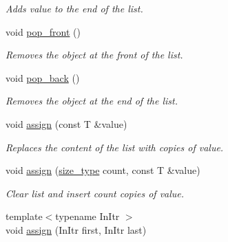 \begin{DoxyCompactItemize}
\begin{DoxyCompactList}\small\item\em Adds value to the end of the list. \end{DoxyCompactList}\item 
\mbox{\label{classls_1_1list_aed8db7c16a16cd2d3290576725f7ffdd}} 
void \hyperlink{classls_1_1list_aed8db7c16a16cd2d3290576725f7ffdd}{pop\+\_\+front} ()
\begin{DoxyCompactList}\small\item\em Removes the object at the front of the list. \end{DoxyCompactList}\item 
\mbox{\label{classls_1_1list_a59d8ce6f60dca1e3a30b3e3d9f4154c2}} 
void \hyperlink{classls_1_1list_a59d8ce6f60dca1e3a30b3e3d9f4154c2}{pop\+\_\+back} ()
\begin{DoxyCompactList}\small\item\em Removes the object at the end of the list. \end{DoxyCompactList}\item 
\mbox{\label{classls_1_1list_aef14276ef9726f7ed30dbe9a76f4035f}} 
void \hyperlink{classls_1_1list_aef14276ef9726f7ed30dbe9a76f4035f}{assign} (const T \&value)
\begin{DoxyCompactList}\small\item\em Replaces the content of the list with copies of value. \end{DoxyCompactList}\item 
\mbox{\label{classls_1_1list_a8a9ebb0c52a3a472e69cae0f50de5737}} 
void \hyperlink{classls_1_1list_a8a9ebb0c52a3a472e69cae0f50de5737}{assign} (\hyperlink{classls_1_1list_a91bb77719712ad6127f0bdf97ed5bd64}{size\+\_\+type} count, const T \&value)
\begin{DoxyCompactList}\small\item\em Clear list and insert count copies of value. \end{DoxyCompactList}\item 
\mbox{\label{classls_1_1list_a8528bc556cc62982161cd369e65ad3b7}} 
{\footnotesize template$<$typename In\+Itr $>$ }\\void \hyperlink{classls_1_1list_a8528bc556cc62982161cd369e65ad3b7}{assign} (In\+Itr first, In\+Itr last)

\end{DoxyCompactItemize}

